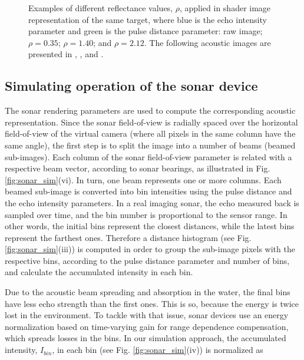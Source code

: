\documentclass[final,5p,times]{elsarticle}
\begin{document}
\begin{figure}[!ht]
{        \label{fig:reflectance:view:2_12}
    }
    \captionsetup{justification=justified}
    \caption{Examples of different reflectance values, $\rho$, applied in
    shader image representation of the same target, where blue is the echo intensity parameter and green is the pulse distance parameter:  raw image;
     $\rho = 0.35$;
     $\rho = 1.40$; and
     $\rho = 2.12$. The following
    acoustic images are presented in ,
    , 
    and .}
    \label{fig:sonar_reflectances}
\end{figure}


\subsection{Simulating operation of the sonar device}
\label{dev:sonardata}

The sonar rendering parameters are used to compute the corresponding acoustic representation. Since the sonar field-of-view is radially spaced over the horizontal field-of-view of the virtual camera (where all pixels in the same column have the same angle), the first step is to split the image into a number of beams (beamed sub-images). Each column of the sonar field-of-view parameter is related with a respective beam vector, according to sonar bearings, as illustrated in Fig. \ref{fig:sonar_sim}(vi).
In turn, one beam represents one or more columns. Each
beamed sub-image is converted into bin intensities using the pulse distance and the echo intensity parameters. In a real imaging sonar, the echo
measured back is sampled
over time, and the bin number is proportional to the sensor range. In other
words, the initial bins represent the closest distances, while the latest
bins represent the farthest ones. Therefore a distance histogram (see Fig. \ref{fig:sonar_sim}(iii)) is computed in order to
group the sub-image pixels with the respective bins, according to the pulse distance parameter and number of bins,
and calculate the accumulated intensity in each bin.

Due to the acoustic beam spreading and absorption in the water, the final
bins have less echo strength than the first ones. This is so, because the energy is
twice lost in the environment. To tackle with that issue, sonar devices
use an energy normalization based on time-varying gain for range dependence
compensation, which spreads losses in the bins. In our simulation approach,
the accumulated intensity, $I_{bin}$, in each bin (see Fig. \ref{fig:sonar_sim}(iv)) is normalized as
\end{document}
